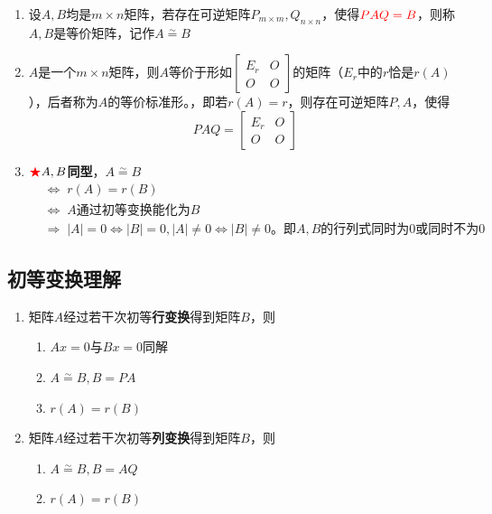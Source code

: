 \documentclass[./linear_algebra.tex]{subfiles}
\begin{document}
    \begin{enumerate}
        \item 设$A, B$均是$m\times n$矩阵，若存在可逆矩阵$P_{m\times m}, Q_{n\times n}$，使得${\color{red}{PAQ = B}}$，则称$A, B$是等价矩阵，记作$A \overset{\sim}{=} B$
        \item $A$是一个$m\times n$矩阵，则$A$等价于形如$\begin{bmatrix}
                                                           E_r & O \\
                                                           O & O
        \end{bmatrix}$的矩阵（$E_r$中的$r$恰是$r(A)$），后者称为$A$的等价标准形。{\color{red}{等价标准形是唯一的}}，即若$r(A) = r$，则存在可逆矩阵$P, A$，使得
        \[
            PAQ = \begin{bmatrix}
                      E_r & O \\
                      O & O
            \end{bmatrix}
        \]
        \item ${\color{red}{\bigstar}}A, B$\textbf{同型}，$A \overset{\sim}{=} B$
        \begin{align*}
            &\Leftrightarrow\; r(A) = r(B)  \\
            &\Leftrightarrow\; A \text{通过初等变换能化为} B  \\
            &\Rightarrow\; |A| = 0 \Leftrightarrow |B| = 0, |A| \neq 0 \Leftrightarrow |B| \neq 0 \text{。即}A, B\text{的行列式同时为0或同时不为0}
        \end{align*}
    \end{enumerate}

    \subsection{初等变换理解}

    \begin{enumerate}
        \item 矩阵$A$经过若干次初等\textbf{行变换}得到矩阵$B$，则
        \begin{enumerate}
            \item $Ax = 0$与$Bx = 0$同解
            \item $A \overset{\sim}{=} B, B = PA$
            \item $r(A) = r(B)$
        \end{enumerate}
        \item 矩阵$A$经过若干次初等\textbf{列变换}得到矩阵$B$，则
        \begin{enumerate}
            \item $A \overset{\sim}{=} B, B = AQ$
            \item $r(A) = r(B)$
        \end{enumerate}
    \end{enumerate}
\end{document}

